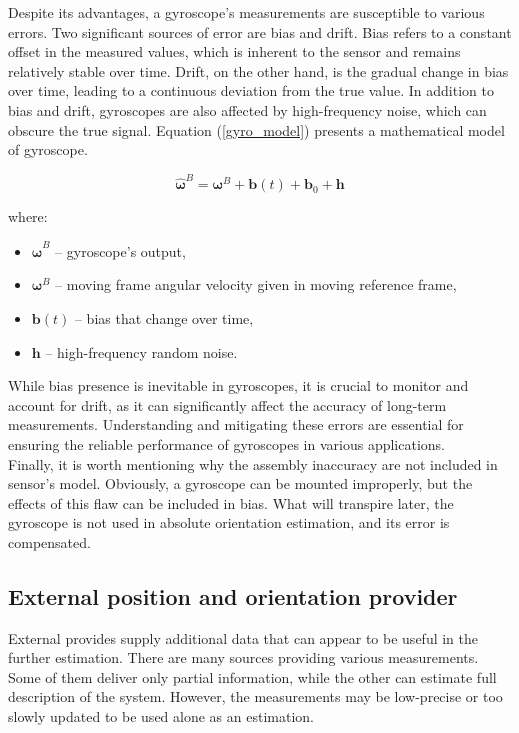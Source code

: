Despite its advantages, a gyroscope's measurements are susceptible to various errors. Two significant sources of error are bias and drift. Bias refers to a constant offset in the measured values, which is inherent to the sensor and remains relatively stable over time. Drift, on the other hand, is the gradual change in bias over time, leading to a continuous deviation from the true value. In addition to bias and drift, gyroscopes are also affected by high-frequency noise, which can obscure the true signal. Equation (\ref{gyro_model}) presents a mathematical model of gyroscope.

\begin{equation}
	\bm{\hat{\omega}}^B = \bm{\omega}^B + \bm{b}(t) + \bm{b}_0 + \bm{h}
	\label{gyro_model}
\end{equation}

where:
\begin{itemize}
	\item $\bm{\hat{\omega}}^B$ -- gyroscope's output,
	\item $\bm{\omega}^B$ -- moving frame angular velocity given in moving reference frame,
	\item $\bm{b}(t)$ -- bias that change over time,
	\item $\bm{h}$ -- high-frequency random noise.
\end{itemize}

While bias presence is inevitable in gyroscopes, it is crucial to monitor and account for drift, as it can significantly affect the accuracy of long-term measurements. Understanding and mitigating these errors are essential for ensuring the reliable performance of gyroscopes in various applications.\\

Finally, it is worth mentioning why the assembly inaccuracy are not included in sensor's model. Obviously, a gyroscope can be mounted improperly, but the effects of this flaw can be included in bias. What will transpire later, the gyroscope is not used in absolute orientation estimation, and its error is compensated.

\subsection{External position and orientation provider}

External provides supply additional data that can appear to be useful in the further estimation. There are many sources providing various measurements. Some of them deliver only partial information, while the other can estimate full description of the system. However, the measurements may be low-precise or too slowly updated to be used alone as an estimation.\\


